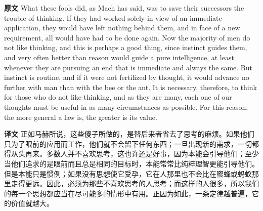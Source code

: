 \documentclass[UTF8,zihao=-4]{ctexart}
\newcommand{\BodyFont}{\fontsize{10.5pt}{15.5pt}\selectfont}
\newcommand{\origlabel}{\textbf{原文}\quad}
\newcommand{\translabel}{\textbf{译文}\quad}
\newenvironment{enblock}{\par\noindent\begingroup\BodyFont\origlabel}{\par\endgroup}
\newenvironment{zhblock}{\par\noindent\begingroup\BodyFont\translabel}{\par\endgroup\vspace{0.35em}}
\begin{document}
\begin{enblock}
What these fools did, as Mach has said, was to save their successors the trouble of thinking. If they had worked solely in view of an immediate application, they would have left nothing behind them, and in face of a new requirement, all would have had to be done again. Now the majority of men do not like thinking, and this is perhaps a good thing, since instinct guides them, and very often better than reason would guide a pure intelligence, at least whenever they are pursuing an end that is immediate and always the same. But instinct is routine, and if it were not fertilized by thought, it would advance no further with man than with the bee or the ant. It is necessary, therefore, to think for those who do not like thinking, and as they are many, each one of our thoughts must be useful in as many circumstances as possible. For this reason, the more general a law is, the greater is its value.
\end{enblock}
\begin{zhblock}
正如马赫所说，这些傻子所做的，是替后来者省去了思考的麻烦。如果他们只为了眼前的应用而工作，他们就不会留下任何东西；一旦出现新的需求，一切都得从头再来。多数人并不喜欢思考，这也许还是好事，因为本能会引导他们；至少当他们追求的是眼前而且总是相同的目标时，本能常常比纯粹理智更能引导他们。但是本能只是惯例；如果没有思想使它受孕，它在人那里也不会比在蜜蜂或蚂蚁那里走得更远。因此，必须为那些不喜欢思考的人思考；而这样的人很多，所以我们的每一个思想都应当在尽可能多的情形中有用。正因为如此，一条定律越普遍，它的价值就越大。\end{zhblock}
\end{document}
